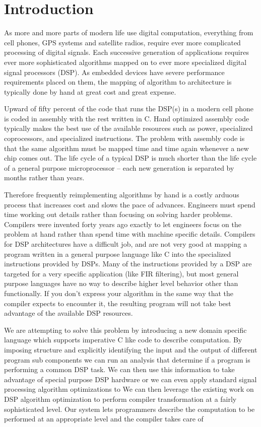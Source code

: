 \section{Introduction}
As more and more parts of modern life use digital computation, everything from cell phones, GPS systems
and satellite radios, require ever more complicated processing of digital signals. 
Each successive generation of applications requires ever more sophisticated algorithms mapped 
on to ever more specialized digital signal processors (DSP). As 
embedded devices have severe performance requirements placed on them,
the mapping of algorithm to architecture is typically done by hand at great cost and great expense.

Upward of fifty percent of the code that runs the DSP(s) in a modern cell phone is coded in assembly
with the rest written in C. Hand optimized assembly code typically makes the best use of the 
available resources such as power, specialized coprocessors, and specialized instructions.
The problem with assembly code is that the same algorithm must be mapped time and time again 
whenever a new chip comes out. The life cycle of a typical DSP is much shorter than the life
cycle of a general purpose microprocessor -- each new generation is separated by months rather
than years.
 
Therefore frequently reimplementing algorithms by hand is a costly arduous process that 
increases cost and slows the pace of advances. Engineers must spend time working out details rather 
than focusing on solving harder problems. Compilers were invented forty years ago 
exactly to let engineers focus on the problem at hand rather than spend time with 
machine specific details. Compilers for DSP architectures have a difficult job, and are not
very good at mapping a program written in a general purpose language like C into the specialized 
instructions provided by DSPs. Many of the instructions provided by a DSP are targeted 
for a very specific application (like FIR filtering), but most general purpose languages have
no way to describe higher level behavior other than functionally. If you don't express
your algorithm in the same way that the compiler expects to encounter it, the resulting
program will not take best advantage of the available DSP resources.

We are attempting to solve this problem by introducing a new domain specific language which
supports imperative C like code to describe computation. By imposing structure and
explicitly identifying the input and the output of different program sub components
we can run an analysis that determine if a program is performing a common DSP task.  
We can then use this information to take advantage of special purpose DSP hardware
or we can even apply standard signal processing algorithm optimizations to 
We can then leverage the existing work on DSP algorithm optimization to perform compiler transformation
at a fairly sophisticated level. Our system lets programmers describe the
computation to be performed at an appropriate level and the compiler takes care of 


